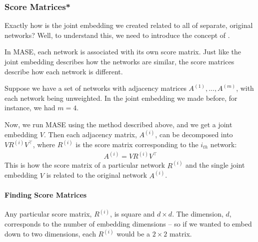 \documentclass[letterpaper,10pt,english]{jupyterBook}
\begin{document}
\begin{sphinxVerbatim}[commandchars=\\\{\}]
     

  
  
\end{sphinxVerbatim}

\noindent{}


\subsubsection{Score Matrices*}
\label{\detokenize{representations/ch6/multigraph-representation-learning:score-matrices}}
\sphinxAtStartPar
Exactly how is the joint embedding we created related to all of separate, original networks? Well, to understand this, we need to introduce the concept of .

\sphinxAtStartPar
In MASE, each network is associated with its own score matrix. Just like the joint embedding describes how the networks are similar, the score matrices describe how each network is different.

\sphinxAtStartPar
Suppose we have a set of networks with adjacency matrices \(A^{(1)}, ..., A^{(m)}\), with each network being unweighted. In the joint embedding we made before, for instance, we had \(m=4\).

\sphinxAtStartPar
Now, we run MASE using the method described above, and we get a joint embedding \(V\). Then each adjacency matrix, \(A^{(i)}\), can be decomposed into \(VR^{(i)} V^\top\), where \(R^{(i)}\) is the score matrix corresponding to the \(i_{th}\) network:
\begin{align*}
    A^{(i)} = VR^{(i)} V^\top
\end{align*}
\sphinxAtStartPar
This is how the score matrix of a particular network \(R^{(i)}\) and the single joint embedding \(V\) is related to the original network \(A^{(i)}\).


\paragraph{Finding Score Matrices}
\label{\detokenize{representations/ch6/multigraph-representation-learning:finding-score-matrices}}
\sphinxAtStartPar
Any particular score matrix, \(R^{(i)}\), is square and \(d \times d\). The dimension, \(d\), corresponds to the number of embedding dimensions – so if we wanted to embed down to two dimensions, each \(R^{(i)}\) would be a \(2 \times 2\) matrix.
\end{document}
